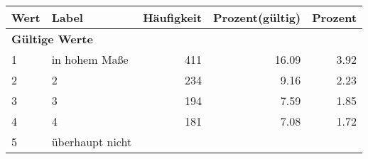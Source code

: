      \begin{longtable}{lXrrr}
     \toprule
     \textbf{Wert} & \textbf{Label} & \textbf{Häufigkeit} & \textbf{Prozent(gültig)} & \textbf{Prozent} \\
     \endhead
     \midrule
     \multicolumn{5}{l}{\textbf{Gültige Werte}}\\

     1 &
     \multicolumn{1}{X}{ in hohem Maße   } &


       \num{411} &
       \num[round-mode=places,round-precision=2]{16.09} &
         \num[round-mode=places,round-precision=2]{3.92} \\

     2 &
     \multicolumn{1}{X}{ 2   } &


       \num{234} &
       \num[round-mode=places,round-precision=2]{9.16} &
         \num[round-mode=places,round-precision=2]{2.23} \\

     3 &
     \multicolumn{1}{X}{ 3   } &


       \num{194} &
       \num[round-mode=places,round-precision=2]{7.59} &
         \num[round-mode=places,round-precision=2]{1.85} \\

     4 &
     \multicolumn{1}{X}{ 4   } &


       \num{181} &
       \num[round-mode=places,round-precision=2]{7.08} &
         \num[round-mode=places,round-precision=2]{1.72} \\

     5 &
     \multicolumn{1}{X}{ überhaupt nicht   } &



\end{longtable}
